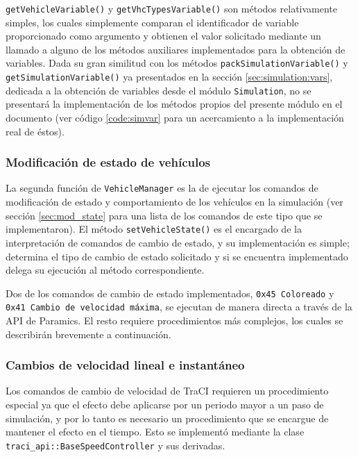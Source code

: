 \texttt{getVehicleVariable()} y \texttt{getVhcTypesVariable()} son métodos relativamente simples, los cuales simplemente comparan el identificador de variable proporcionado como argumento y obtienen el valor solicitado mediante un llamado a alguno de los métodos auxiliares implementados para la obtención de variables. Dada su gran similitud con los métodos \texttt{packSimulationVariable()} y \texttt{getSimulationVariable()} ya presentados en la sección \ref{sec:simulation:vars}, dedicada a la obtención de variables desde el módulo \texttt{Simulation}, no se presentará la implementación de los métodos propios del presente módulo en el documento (ver código \ref{code:simvar} para un acercamiento a la implementación real de éstos).

\subsubsection{Modificación de estado de vehículos}

La segunda función de \texttt{VehicleManager} es la de ejecutar los comandos de modificación de estado y comportamiento de los vehículos en la simulación (ver sección \ref{sec:mod_state} para una lista de los comandos de este tipo que se implementaron). El método \texttt{setVehicleState()} es el encargado de la interpretación de comandos de cambio de estado, y su implementación es simple; determina el tipo de cambio de estado solicitado y si se encuentra implementado delega su ejecución al método correspondiente.

Dos de los comandos de cambio de estado implementados, \texttt{0x45 Coloreado} y \texttt{0x41 Cambio de velocidad máxima}, se ejecutan de manera directa a través de la API de Paramics. El resto requiere procedimientos más complejos, los cuales se describirán brevemente a continuación.

\subsubsection{Cambios de velocidad lineal e instantáneo}\label{sec:speedoverride}

Los comandos de cambio de velocidad de TraCI requieren un procedimiento especial ya que el efecto debe aplicarse por un periodo mayor a un paso de simulación, y por lo tanto es necesario un procedimiento que se encargue de mantener el efecto en el tiempo. Esto se implementó mediante la clase \texttt{traci\_api::BaseSpeedController} y sus derivadas.

